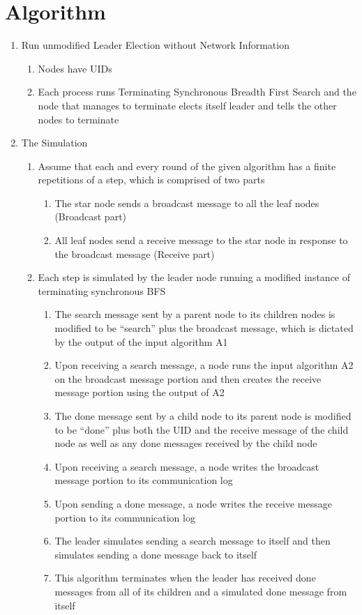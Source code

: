 \documentclass[english]{article}
\begin{document}
\section{Algorithm}

\begin{enumerate}
\item Run unmodified Leader Election without Network Information 

  \begin{enumerate}
  \item Nodes have UIDs
  \item Each process runs Terminating Synchronous Breadth First Search and the node that manages to terminate elects itself leader and tells the other nodes to terminate
  \end{enumerate}

\item The Simulation

  \begin{enumerate}
  \item Assume that each and every round of the given algorithm has a finite repetitions of a step, which is comprised of two parts
    \begin{enumerate}
    \item The star node sends a broadcast message to all the leaf nodes (Broadcast part)
    \item All leaf nodes send a receive message to the star node in response to the broadcast message (Receive part)
    \end{enumerate}

  \item Each step is simulated by the leader node running a modified instance of terminating synchronous BFS
    \begin{enumerate}
    \item The search message sent by a parent node to its children nodes is modified to be ``search'' plus the broadcast message, which is dictated by the output of the input algorithm A1
    \item Upon receiving a search message, a node runs the input algorithm A2 on the broadcast message portion and then creates the receive message portion using the output of A2
    \item The done message sent by a child node to its parent node is modified to be ``done'' plus both the UID and the receive message of the child node as well as any done messages received by the child node 
    \item Upon receiving a search message, a node writes the broadcast message portion to its communication log
    \item Upon sending a done message, a node writes the receive message portion to its communication log
    \item The leader simulates sending a search message to itself and then simulates sending a done message back to itself
    \item This algorithm terminates when the leader has received done messages from all of its children and a simulated done message from itself
    \end{enumerate}


\end{enumerate}
\end{enumerate}
\end{document}
